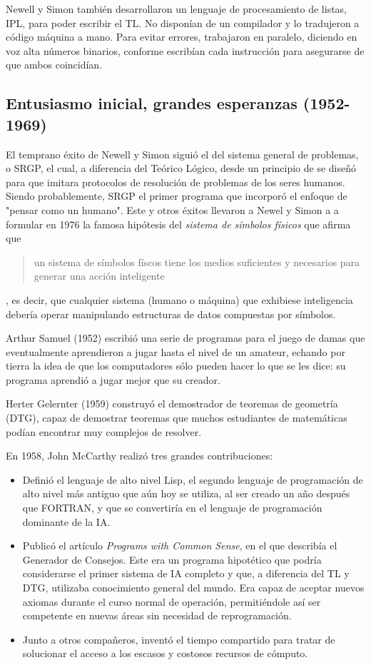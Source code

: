 \documentclass[12pt,a4paper]{article}
\begin{document}
Newell y Simon también desarrollaron un lenguaje de procesamiento de listas, IPL, para poder escribir el TL. No disponían de un compilador y lo tradujeron a código máquina a mano. Para evitar errores, trabajaron en paralelo, diciendo en voz alta números binarios, conforme escribían cada instrucción para asegurarse de que ambos coincidían.

\subsection{Entusiasmo inicial, grandes esperanzas (1952-1969)}
El temprano éxito de Newell y Simon siguió el del sistema general de problemas, o SRGP, el cual, a diferencia del Teórico Lógico, desde un principio de se diseñó para que imitara protocolos de resolución de problemas de los seres humanos. Siendo probablemente, SRGP el primer programa que incorporó el enfoque de "pensar como un humano". Este y otros éxitos llevaron a Newel y Simon a a formular en 1976 la famosa hipótesis del \emph{sistema de símbolos físicos} que afirma que \begin{quote}\small un sistema de símbolos físcos tiene los medios suficientes y necesarios para generar una acción inteligente\end{quote}, es decir, que cualquier sistema (humano o máquina) que exhibiese inteligencia debería operar manipulando estructuras de datos compuestas por símbolos.

Arthur Samuel (1952) escribió una serie de programas para el juego de damas que eventualmente aprendieron a jugar hasta el nivel de un amateur, echando por tierra la idea de que los computadores sólo pueden hacer lo que se les dice: su programa aprendió a jugar mejor que su creador.

Herter Gelernter (1959) construyó el demostrador de teoremas de geometría (DTG), capaz de demostrar teoremas que muchos estudiantes de matemáticas podían encontrar muy complejos de resolver.

En 1958, John McCarthy realizó tres grandes contribuciones:
\begin{itemize}
\item Definió el lenguaje de alto nivel Lisp, el segundo lenguaje de programación de alto nivel más antiguo que aún hoy se utiliza, al ser creado un año después que FORTRAN, y que se convertiría en el lenguaje de programación dominante de la IA.
\item Publicó el artículo \emph{Programs with Common Sense}, en el que describía el Generador de Consejos. Este era un programa hipotético que podría considerarse el primer sistema de IA completo y que, a diferencia del TL y DTG, utilizaba conocimiento general del mundo. Era capaz de aceptar nuevos axiomas durante el curso normal de operación, permitiéndole así ser competente en nuevas áreas sin necesidad de reprogramación.
\item Junto a otros compañeros, inventó el tiempo compartido para tratar de solucionar el acceso a los escasos y costosos recursos de cómputo.
\end{itemize}
\end{document}
